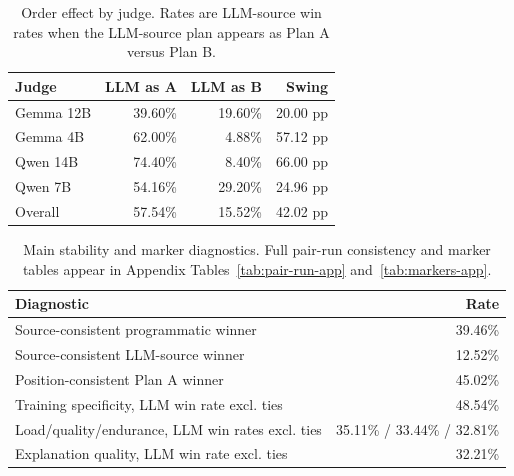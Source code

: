 \documentclass[11pt]{article}
\begin{document}
\begin{table}[t]
\centering
\scriptsize
\setlength{\tabcolsep}{3pt}
\begin{tabular}{lrrr}
\toprule
Judge & LLM as A & LLM as B & Swing \\
\midrule
Gemma 12B & 39.60\% & 19.60\% & 20.00 pp \\
Gemma 4B & 62.00\% & 4.88\% & 57.12 pp \\
Qwen 14B & 74.40\% & 8.40\% & 66.00 pp \\
Qwen 7B & 54.16\% & 29.20\% & 24.96 pp \\
Overall & 57.54\% & 15.52\% & 42.02 pp \\
\bottomrule
\end{tabular}
\caption{Order effect by judge. Rates are LLM-source win rates when the LLM-source plan appears as Plan A versus Plan B.}
\label{tab:order-main}
\end{table}

\begin{table}[t]
\centering
\scriptsize
\setlength{\tabcolsep}{3pt}
\begin{tabular}{p{}r}
\toprule
Diagnostic & Rate \\
\midrule
Source-consistent programmatic winner & 39.46\% \\
Source-consistent LLM-source winner & 12.52\% \\
Position-consistent Plan A winner & 45.02\% \\
Training specificity, LLM win rate excl. ties & 48.54\% \\
Load/quality/endurance, LLM win rates excl. ties & 35.11\% / 33.44\% / 32.81\% \\
Explanation quality, LLM win rate excl. ties & 32.21\% \\
\bottomrule
\end{tabular}
\caption{Main stability and marker diagnostics. Full pair-run consistency and marker tables appear in Appendix Tables~\ref{tab:pair-run-app} and~\ref{tab:markers-app}.}
\label{tab:diagnostics-main}
\end{table}
\end{document}
